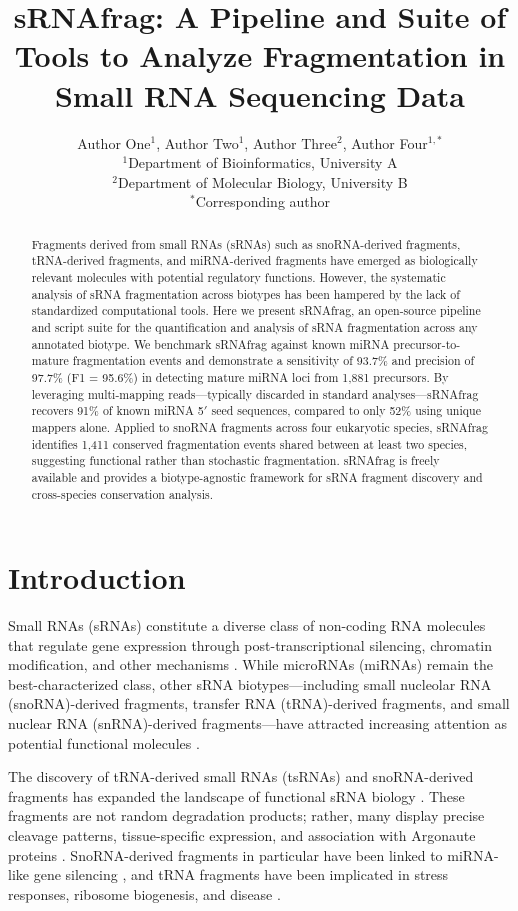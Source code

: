 \documentclass[11pt]{article}
\title{sRNAfrag: A Pipeline and Suite of Tools to Analyze Fragmentation in Small RNA Sequencing Data}
\author{
  Author One$^{1}$, Author Two$^{1}$, Author Three$^{2}$, Author Four$^{1,*}$ \\
  $^{1}$Department of Bioinformatics, University A \\
  $^{2}$Department of Molecular Biology, University B \\
  $^{*}$Corresponding author
}
\date{}
\begin{document}
\maketitle

\begin{abstract}
Fragments derived from small RNAs (sRNAs) such as snoRNA-derived fragments, tRNA-derived fragments, and miRNA-derived fragments have emerged as biologically relevant molecules with potential regulatory functions. However, the systematic analysis of sRNA fragmentation across biotypes has been hampered by the lack of standardized computational tools. Here we present sRNAfrag, an open-source pipeline and script suite for the quantification and analysis of sRNA fragmentation across any annotated biotype. We benchmark sRNAfrag against known miRNA precursor-to-mature fragmentation events and demonstrate a sensitivity of 93.7\% and precision of 97.7\% (F1 = 95.6\%) in detecting mature miRNA loci from 1,881 precursors. By leveraging multi-mapping reads---typically discarded in standard analyses---sRNAfrag recovers 91\% of known miRNA 5$'$ seed sequences, compared to only 52\% using unique mappers alone. Applied to snoRNA fragments across four eukaryotic species, sRNAfrag identifies 1,411 conserved fragmentation events shared between at least two species, suggesting functional rather than stochastic fragmentation. sRNAfrag is freely available and provides a biotype-agnostic framework for sRNA fragment discovery and cross-species conservation analysis.
\end{abstract}

\section{Introduction}

Small RNAs (sRNAs) constitute a diverse class of non-coding RNA molecules that regulate gene expression through post-transcriptional silencing, chromatin modification, and other mechanisms \citep{bartel2004,ghildiyal2009}. While microRNAs (miRNAs) remain the best-characterized class, other sRNA biotypes---including small nucleolar RNA (snoRNA)-derived fragments, transfer RNA (tRNA)-derived fragments, and small nuclear RNA (snRNA)-derived fragments---have attracted increasing attention as potential functional molecules \citep{kumar2016,li2012,maute2013}.

The discovery of tRNA-derived small RNAs (tsRNAs) and snoRNA-derived fragments has expanded the landscape of functional sRNA biology \citep{lee2009,ender2008}. These fragments are not random degradation products; rather, many display precise cleavage patterns, tissue-specific expression, and association with Argonaute proteins \citep{haussecker2010,taft2009}. SnoRNA-derived fragments in particular have been linked to miRNA-like gene silencing \citep{ender2008}, and tRNA fragments have been implicated in stress responses, ribosome biogenesis, and disease \citep{anderson2015,goodarzi2015}.
\end{document}

